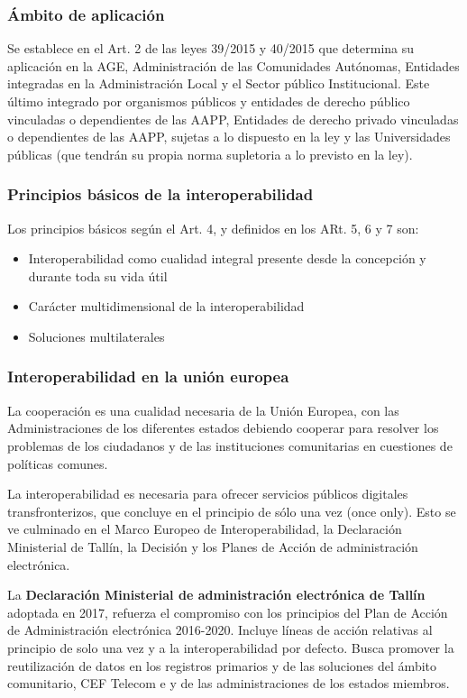     \subsubsection{Ámbito de aplicación} %
        Se establece en el Art. 2 de las leyes 39/2015 y 40/2015 que determina su aplicación en la AGE, Administración de las Comunidades Autónomas, Entidades integradas en la Administración Local y el Sector público Institucional. Este último integrado por organismos públicos y entidades de derecho público vinculadas o dependientes de las AAPP, Entidades de derecho privado vinculadas o dependientes de las AAPP, sujetas a lo dispuesto en la ley y las Universidades públicas (que tendrán su propia norma supletoria a lo previsto en la ley).

    \subsubsection{Principios básicos de la interoperabilidad} %
        Los principios básicos según el Art. 4, y definidos en los ARt. 5, 6 y 7 son:
        \begin{itemize}
            \item Interoperabilidad como cualidad integral presente desde la concepción y durante toda su vida útil
            \item Carácter multidimensional de la interoperabilidad
            \item Soluciones multilaterales
        \end{itemize}

    \subsubsection{Interoperabilidad en la unión europea} %
        La cooperación es una cualidad necesaria de la Unión Europea, con las Administraciones de los diferentes estados debiendo cooperar para resolver los problemas de los ciudadanos y de las instituciones comunitarias en cuestiones de políticas comunes.

        La interoperabilidad es necesaria para ofrecer servicios públicos digitales transfronterizos, que concluye en el principio de sólo una vez (once only). Esto se ve culminado en el Marco Europeo de Interoperabilidad, la Declaración Ministerial de Tallín, la Decisión \ISA y los Planes de Acción de administración electrónica.

        La \textbf{Declaración Ministerial de administración electrónica de Tallín} adoptada en 2017, refuerza el compromiso con los principios del Plan de Acción de Administración electrónica 2016-2020. Incluye líneas de acción relativas al principio de solo una vez y a la interoperabilidad por defecto. Busca promover la reutilización de datos en los registros primarios y de las soluciones del ámbito comunitario, CEF Telecom e \ISA y de las administraciones de los estados miembros. 

